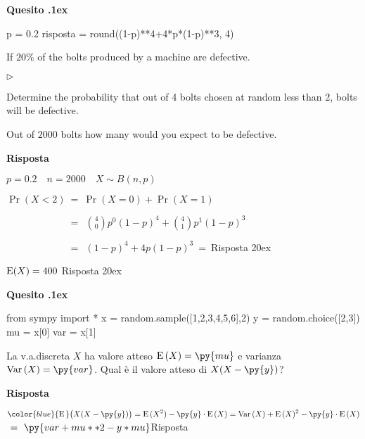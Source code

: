 \documentclass[11pt,twoside,a4paper]{article}
\newcommand{\mylabel}[1]{#1\hfill}
\renewenvironment{itemize}
  {\begin{list}{$\triangleright$}{%
   \setlength{\parskip}{0mm}
   \setlength{\topsep}{.4\baselineskip}
   \setlength{\rightmargin}{0mm}
   \setlength{\listparindent}{0mm}
   \setlength{\itemindent}{0mm}
   \setlength{\labelwidth}{2ex}
   \setlength{\itemsep}{.4\baselineskip}
   \setlength{\parsep}{0mm}
   \setlength{\partopsep}{0mm}
   \setlength{\labelsep}{1ex}
   \setlength{\leftmargin}{\labelwidth+\labelsep}
   \let\makelabel\mylabel}}{%
   \end{list}\vspace*{-1.3mm}}
\newcounter{quesito}
\newenvironment{question}{\addtocounter{quesito}{1}\bigskip\bigskip\par\textbf{Quesito \thequesito.\kern1ex}}{\vspace{\parskip}}
\newenvironment{answer}{\par\textbf{Risposta\quad}}{\vspace{\parskip}}
\begin{document}
\begin{question}
\def\RR{{\mathds R}}
\def\E{{\rm E}}
\def\dom{{\rm dom}}
\def\range{{\rm im}}
\begin{pycode}
p = 0.2
risposta = round((1-p)**4+4*p*(1-p)**3, 4)
\end{pycode}
If $20\%$ of the bolts produced by a machine are defective.
\begin{itemize}

\item[1.] Determine the probability that out of 4 bolts chosen at random less than 2, bolts will be defective.

\item[2.] Out of $2000$ bolts how many would you expect to be defective.
\end{itemize}
\begin{answer}

$p=0.2\quad n=2000\quad X\sim B(n,p)$

$\displaystyle\Pr(X<2)
\ =\ \Pr(X=0)+\Pr(X=1)$

$\displaystyle\phantom{\Pr(X<2)}\ =\ \
{4\choose 0}p^0(1-p)^4+{4\choose 1}p^1(1-p)^3$

$\displaystyle\phantom{\Pr(X<2)}\ =\ \
(1-p)^4+4p(1-p)^3\ =\ ${\color{blue}\hfill Risposta 2\kern0ex}

{\color{blue}
$\E(X)=400$
\hfill Risposta 2\kern0ex}

\end{answer}
\end{question}




\begin{question}
\def\Pr{{\rm Pr\,}}
\def\Ex{{\rm E\,}}
\def\Var{{\rm Var\,}}
\begin{pycode}
from sympy import *
x = random.sample([1,2,3,4,5,6],2)
y = random.choice([2,3])
mu = x[0]
var = x[1]
\end{pycode}
La v.a.\@ discreta $X$ ha valore atteso $\Ex(X)=\py{mu}$ e varianza $\Var(X)=\py{var}$. Qual è il valore atteso di $X(X-\py{y})$?  
\begin{answer}

$\displaystyle{\color{blue}\Ex\big(X(X-\py{y})\big)}=\Ex(X^2)-\py{y}\cdot\Ex(X)=\Var(X)+\Ex(X)^2-\py{y}\cdot\Ex(X)${\color{blue}$\ =\ \displaystyle\py{var+mu**2-y*mu}$\hfill Risposta} 
\end{answer}
\end{question}
\end{document}
